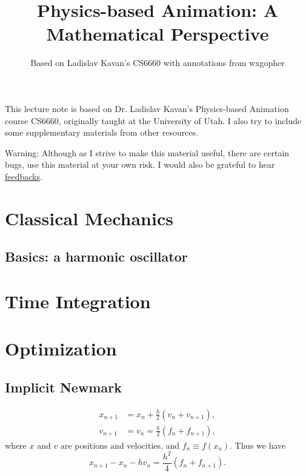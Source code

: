 \documentclass{fancydoc}
\begin{document}
\title{Physics-based Animation: A Mathematical Perspective}
\author{Based on Ladislav Kavan's CS6660 with annotations from wxgopher}

\maketitle
\tableofcontents
\newpage
{\large This lecture note is based on Dr. Ladislav Kavan's Physics-based Animation course CS6660, originally taught at the University of Utah. I also try to include some supplementary materials from other resources.}


{\large Warning: Although as I strive to make this material useful, there are certain bugs, use this material at your own risk. I would also be grateful to hear \href{mailto:wxguojlu@gmail.com}{feedbacks}.}

\dotfill

\section{Classical Mechanics}

\subsection{Basics: a harmonic oscillator}

\section{Time Integration}

\section{Optimization}
\subsection{Implicit Newmark}

\begin{subequations}
	\begin{align}
	x_{n+1} &= x_n + \frac{h}{2}(v_n + v_{n+1}),\\
	v_{n+1} &= v_n = \frac{h}{2}(f_n + f_{n+1}),
	\end{align}
\end{subequations}
where $x$ and $v$ are positions and velocities, and $f_n \equiv f(x_n)$. Thus we have
\begin{equation}\label{secoptim:nw_eq}
x_{n+1} - x_n - hv_n = \frac{h^2}{4}(f_n + f_{n+1}).
\end{equation}
\end{document}
